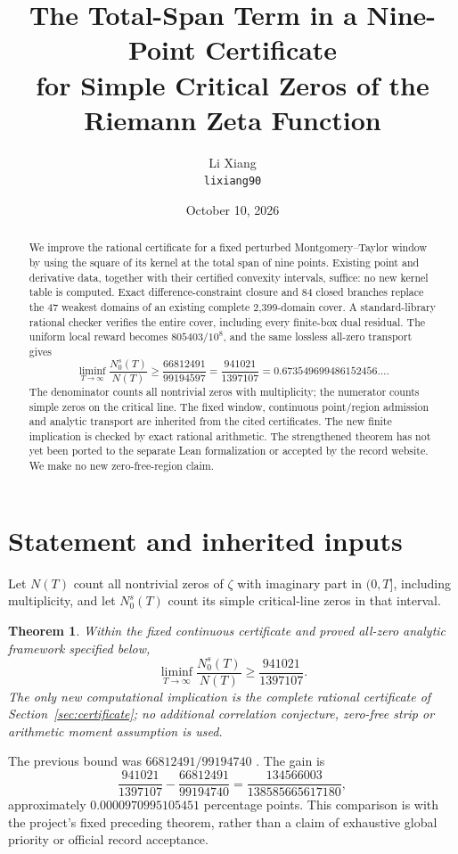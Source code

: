 \documentclass[11pt,a4paper]{article}
\title{The Total-Span Term in a Nine-Point Certificate\\
for Simple Critical Zeros of the Riemann Zeta Function}
\author{Li Xiang\\\small\texttt{lixiang90}}
\date{October 10, 2026}
\newtheorem{theorem}{Theorem}[section]
\begin{document}
\maketitle
\begin{abstract}
We improve the rational certificate for a fixed perturbed
Montgomery--Taylor window by using the square of its kernel at the
total span of nine points. Existing point and derivative data, together
with their certified convexity intervals, suffice: no new kernel table
is computed. Exact difference-constraint closure and 84 closed branches
replace the 47 weakest domains of an existing complete 2,399-domain
cover. A standard-library rational checker verifies the entire cover,
including every finite-box dual residual. The uniform local reward
becomes $805403/10^8$, and the same lossless all-zero transport gives
\[
 \liminf_{T\to\infty}\frac{N_0^s(T)}{N(T)}
 \ge\frac{66812491}{99194597}=\frac{941021}{1397107}
 =0.673549699486152456\ldots.
\]
The denominator counts all nontrivial zeros with multiplicity; the
numerator counts simple zeros on the critical line. The fixed window,
continuous point/region admission and analytic transport are inherited
from the cited certificates. The new finite implication is checked by
exact rational arithmetic. The strengthened theorem has not yet been
ported to the separate Lean formalization or accepted by the record
website. We make no new zero-free-region claim.
\end{abstract}

\section{Statement and inherited inputs}

Let $N(T)$ count all nontrivial zeros of $\zeta$ with imaginary part in
$(0,T]$, including multiplicity, and let $N_0^s(T)$ count its simple
critical-line zeros in that interval.

\begin{theorem}\label{thm:main}
Within the fixed continuous certificate and proved all-zero analytic
framework specified below,
\[
 \liminf_{T\to\infty}\frac{N_0^s(T)}{N(T)}
 \ge \frac{941021}{1397107}.
\]
The only new computational implication is the complete rational
certificate of Section~\ref{sec:certificate}; no additional correlation
conjecture, zero-free strip or arithmetic moment assumption is used.
\end{theorem}

The previous bound was $66812491/99194740$ \cite{Expanded}. The gain is
\[
 \frac{941021}{1397107}-\frac{66812491}{99194740}
 =\frac{134566003}{138585665617180},
\]
approximately $0.0000970995105451$ percentage points. This comparison
is with the project's fixed preceding theorem, rather than a claim
of exhaustive global priority or official record acceptance.
\end{document}
